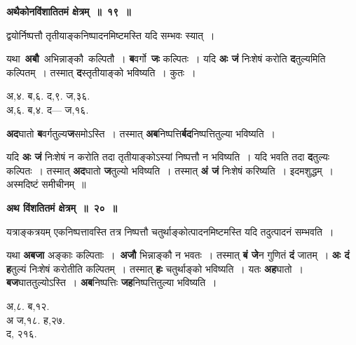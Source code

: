 \documentclass[11pt, openany]{book}
\begin{document}
\begin{center}
\textbf{\large अथैकोनविंशातितमं क्षेत्रम्~॥~१९~॥} \end{center}

 {\ab द्वयोर्निष्पत्तौ तृतीयाङ्कनिष्पादनमिष्टमस्ति यदि सम्भवः स्यात्~। }

\begin{flushleft}
\begin{minipage}[t]{0.6\textwidth}
\hspace{4mm} यथा \,\textbf{अबौ} \,अभिन्नाङ्कौ \,कल्पितौ~। \textbf{ब}वर्गो \,\textbf{जः} कल्पितः~। यदि \textbf{अः जं} निःशेषं करोति \textbf{द}तुल्यमिति कल्पितम्~। तस्मात् \textbf{द}स्तृतीयाङ्को भविष्यति~। कुतः~।
\end{minipage} 
\hfill
\begin{minipage}[t]{0.3\textwidth}
अ,४. ब,६. द,९. ज,३६.\\
अ,६. ब,४. द--- ज,१६.
\end{minipage}
\end{flushleft}
\vspace{-3mm}

\noindent \textbf{अद}घातो \textbf{ब}वर्गतुल्य\textbf{ज}समोऽस्ति~। तस्मात् \textbf{अब}निष्पत्ति\textbf{र्बद}निष्पत्तितुल्या भविष्यति~।\\
\vspace{-1mm}

यदि \textbf{अः जं} निःशेषं न करोति तदा तृतीयाङ्कोऽस्यां निष्पत्तौ न  भविष्यति~। यदि भवति तदा \textbf{द}तुल्यः कल्पितः~। तस्मात् \textbf{अद}घातो \textbf{ज}तुल्यो भविष्यति~। तस्मात् \textbf{अं जं} निःशेषं करिष्यति~। इदमशुद्धम्~। अस्मदिष्टं समीचीनम्~॥ 

\newpage
\begin{center}
\textbf{\large अथ विंशतितमं क्षेत्रम्~॥~२०~॥}
\end{center}

{\ab यत्राङ्कत्रयम् एकनिष्पत्तावस्ति तत्र निष्पत्तौ चतुर्थाङ्कोत्पादनमिष्टमस्ति यदि तदुत्पादनं सम्भवति~।} 

\begin{flushleft}
\begin{minipage}[t]{0.7\textwidth}
\hspace{4mm} यथा \;\textbf{अबजा} \;अङ्काः \;कल्पिताः~। \,\textbf{अजौ} \;भिन्नाङ्कौ \;न भवतः~।  तस्मात्  \textbf{बं जे}न गुणितं \textbf{दं} जातम्~। \textbf{अः दं ह}तुल्यं निःशेषं करोतीति कल्पितम्~। तस्मात् \textbf{हः} चतुर्थाङ्को भविष्यति~। यतः \textbf{अह}घातो~। \textbf{बज}घाततुल्योऽस्ति~। \textbf{अब}निष्पत्तिः \textbf{जह}निष्पत्तितुल्या भविष्यति~। 
\end{minipage} 
\hfill
\begin{minipage}[t]{0.2\textwidth}
अ,८. ब,१२.\\
{\color{white}अ} ज,१८. ह,२७.\\ 
द, २१६.
\end{minipage}
\end{flushleft}
\vspace{-3mm}
\end{document}
